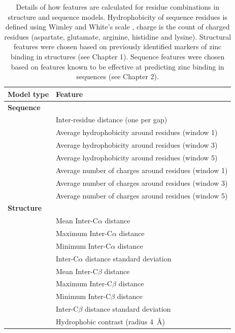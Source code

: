 \begin{table}
  \caption[Feature generation.]{\label{tab:features}Details of how features are calculated
    for residue combinations in structure and sequence models.
    Hydrophobicity of sequence residues is defined using Wimley and
    White's scale \protect\cite{wimley:hphob}, charge is the count of
    charged residues (aspartate, glutamate, arginine, histidine and
    lysine). Structural features were chosen based on previously identified markers
    of zinc binding in structures (see Chapter 1). Sequence features were chosen based on features known to
    be effective at predicting zinc binding in sequences (see Chapter 2).}
\begin{center}
\begin{tabular}{ll} \hline
Model type            &  Feature                                              \\ \hline
{\bfseries Sequence}  &                                                       \\
                      &  Inter-residue distance (one per gap)                 \\
                      &  Average hydrophobicity around residues (window 1)    \\            
                      &  Average hydrophobicity around residues (window 3)    \\
                      &  Average hydrophobicity around residues (window 5)    \\
                      &  Average number of charges around residues (window 1) \\
                      &  Average number of charges around residues (window 3) \\
                      &  Average number of charges around residues (window 5) \\
{\bfseries Structure} &                                                       \\
                      &  Mean Inter-C$\alpha$ distance                        \\
                      &  Maximum Inter-C$\alpha$ distance                     \\
                      &  Minimum Inter-C$\alpha$ distance                     \\
                      &  Inter-C$\alpha$ distance standard deviation          \\
                      &  Mean Inter-C$\beta$ distance                         \\
                      &  Maximum Inter-C$\beta$ distance                      \\
                      &  Minimum Inter-C$\beta$ distance                      \\
                      &  Inter-C$\beta$ distance standard deviation           \\
                      &  Hydrophobic contrast (radius 4~{\AA})                \\ \hline
\end{tabular}
\end{center}
\end{table}

